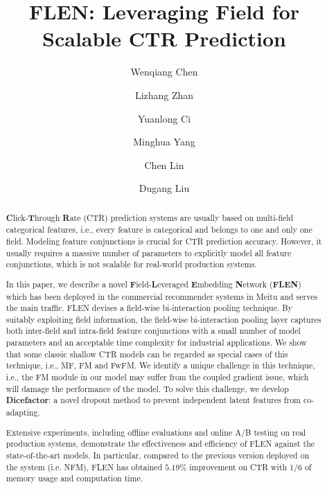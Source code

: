 \documentclass[sigconf]{acmart}
\begin{document}
\title{FLEN: Leveraging Field for Scalable CTR Prediction}



\author{Wenqiang Chen}

\author{Lizhang Zhan}

\author{Yuanlong Ci}

\author{Minghua Yang}

\author{Chen Lin}

\author{Dugang Liu}
\authornotemark[1]
\renewcommand{\shortauthors}{Chen et al.}

\begin{abstract}
\textbf{C}lick-\textbf{T}hrough \textbf{R}ate (CTR) prediction systems are usually based on multi-field categorical features, i.e., every feature is categorical and belongs to one and only one field. Modeling feature conjunctions is crucial for CTR prediction accuracy. 
However, it usually requires a massive number of parameters to explicitly model all feature conjunctions, which is not scalable for real-world production systems. 

In this paper, we describe a novel \textbf{F}ield-\textbf{L}everaged \textbf{E}mbedding \textbf{N}etwork (\textbf{FLEN}) which has been deployed in the commercial recommender systems in Meitu and serves the main traffic. FLEN devises a field-wise bi-interaction pooling technique.
By suitably exploiting field information, the field-wise bi-interaction pooling layer captures both inter-field and intra-field feature conjunctions with a small number of model parameters and an acceptable time complexity for industrial applications.  
We show that some classic shallow CTR models can be regarded as special cases of this technique, i.e., MF, FM and FwFM.  
We identify a unique challenge in this technique, i.e., the FM module in our model may suffer from the coupled gradient issue, which will damage the performance of the model.
To solve this challenge, we develop \textbf{Dicefactor}: a novel dropout method to prevent independent latent features from co-adapting. 

Extensive experiments, including offline evaluations and online A/B testing on real production systems, demonstrate the effectiveness and efficiency of FLEN against the state-of-the-art models. In particular, compared to the previous version deployed on the system (i.e. NFM), FLEN has obtained $5.19\%$ improvement on CTR with $1/6$ of memory usage and computation time. 
\end{abstract}
\end{document}
